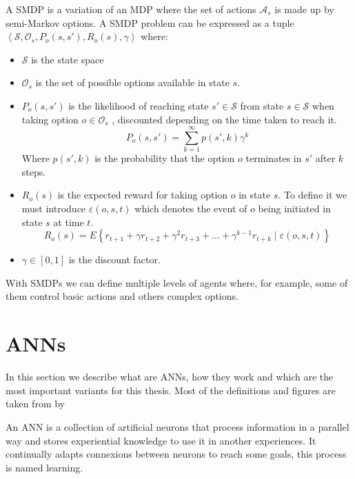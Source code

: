 A \ac{SMDP} is a variation of an \ac{MDP} where the set of actions $\mathcal{A}_s$ is made up by semi-Markov options.
A \ac{SMDP} problem can be expressed as a tuple $\left< \mathcal{S}, \mathcal{O}_s, P_o(s,s'), R_o(s),\gamma \right>$ where:
\begin{itemize}
    \item $\mathcal{S}$ is the state space
    \item $\mathcal{O}_s$ is the set of possible options available in state $s$.
    \item $P_o(s,s')$  is the likelihood of reaching state $s' \in \mathcal{S}$ from state $s \in \mathcal{S}$ when taking
    option $o \in \mathcal{O}_s$ , discounted depending on the time taken to reach it.
    \begin{equation}
        P_o(s,s') = \sum_{k=1}^\infty p(s', k) \gamma^k
    \end{equation}
    Where $p(s',k)$ is the probability that the option $o$ terminates in $s'$ after $k$ steps.
    \item $R_o(s)$ is the expected reward for taking option $o$ in state $s$.
    To define it we must introduce $\varepsilon(o,s,t)$ which denotes the event of $o$ being initiated in state $s$ at time $t$.
    \begin{equation}
        R_o(s) = E\left\{ r_{t+1} + \gamma r_{t+2} + \gamma^2 r_{t+3} + \dots
        + \gamma^{k-1} r_{t+k} \;|\; \varepsilon(o,s,t)\right\}
    \end{equation}
    \item $\gamma \in [0,1]$ is the discount factor.
\end{itemize}

With \acp{SMDP} we can define multiple levels of agents where, for example, some of them control basic actions and others
complex options.

\section{\aclp{ANN}}
In this section we describe what are \acfp{ANN},
how they work and which are the most important variants for this thesis.
Most of the definitions and figures are taken from 
by \citet{simon2009NN}

An \ac{ANN} is a collection of artificial neurons that process information in a
parallel way and stores experiential knowledge to use it in another experiences.
It continually adapts connexions between neurons to reach some goals, this process
is named learning.

